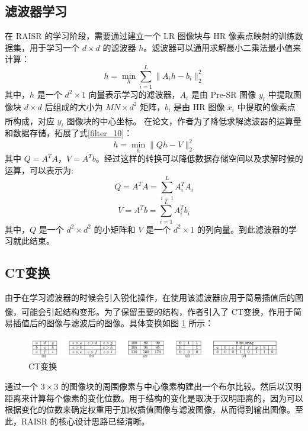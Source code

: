 \documentclass[12pt, a4paper, oneside]{ctexbook}
\begin{document}
	\subsection{滤波器学习}
	在 RAISR 的学习阶段，需要通过建立一个 LR 图像块与 HR 像素点映射的训练数据集，用于学习一个 $d\times d$ 的滤波器 $h$。滤波器可以通用求解最小二乘法最小值来计算：
	\begin{equation}
h=\min_h\sum_{i=1}^L\lVert{A_ih-b_i}\rVert_2^2 \label{filter_10}
	\end{equation} 
	其中，$h$ 是一个 $d^2 \times 1$ 向量表示学习的滤波器，$A_i$ 是由 Pre-SR 图像 $y_i$ 中提取图像块 $d\times d$ 后组成的大小为 $MN\times d^2$ 矩阵，$b_i$ 是由 HR 图像 $x_i$ 中提取的像素点所构成，对应 $y_i$ 图像块的中心坐标。
	在论文\textsuperscript{\cite{1}}，作者为了降低求解滤波器的运算量和数据存储，拓展了式\ref{filter_10}：
	\begin{equation}
h=\min_h\lVert Qh-V\rVert_2^2		\label{filter_11}
	\end{equation}
	其中 $Q=A^TA$，$V=A^Tb$。经过这样的转换可以降低数据存储空间以及求解时候的运算，可以表示为:
	\begin{equation}
Q=A^TA=\sum_{i=1}^LA_i^TA_i
	\end{equation}
	\begin{equation}
V=A^Tb=\sum_{i=1}^LA_i^Tb_i
	\end{equation}
其中，$Q$ 是一个 $d^2 \times d^2$ 的小矩阵和 $V$ 是一个 $d^2 \times 1$ 的列向量。到此滤波器的学习就此结束。

	\subsection{CT变换}
	由于在学习滤波器的时候会引入锐化操作，在使用该滤波器应用于简易插值后的图像，可能会引起结构变形。为了保留重要的结构，作者引入了 CT变换\textsuperscript{\cite{7}}，作用于简易插值后的图像与滤波后的图像。具体变换如图 \ref{CT_tran} 所示：
		\begin{figure}[h]
		\centering
		\includegraphics[scale=0.36]{./pic/CT.png}
		\caption{CT变换}
		\label{CT_tran}
		\end{figure}
	通过一个 $3\times 3$ 的图像块的周围像素与中心像素构建出一个布尔比较。然后以汉明距离来计算每个像素的变化位数。用于结构的变化是取决于汉明距离的，因为可以根据变化的位数来确定权重用于加权插值图像与滤波图像，从而得到输出图像。至此，RAISR 的核心设计思路已经清晰。
	
\end{document}
